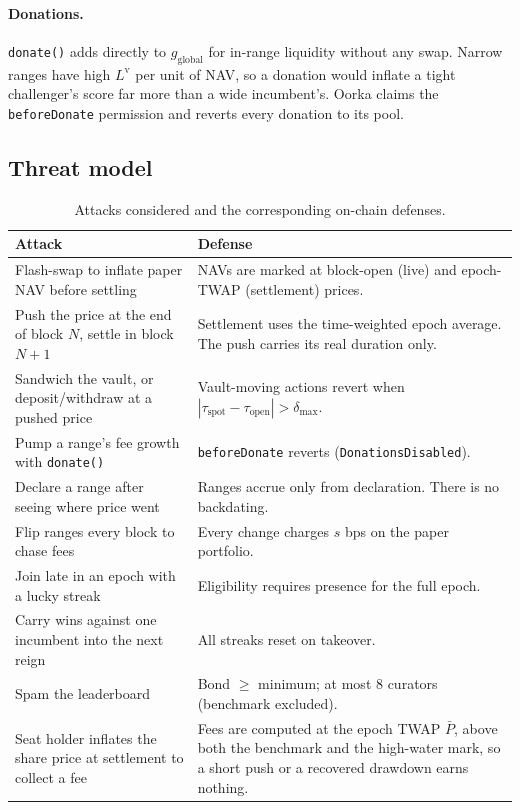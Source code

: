 \documentclass[11pt,a4paper]{article}
\newcommand{\code}[1]{\texttt{\small #1}}
\newcommand{\Lv}{L^{\mathrm{v}}}
\begin{document}
\paragraph{Donations.} \code{donate()} adds directly to $g_{\text{global}}$ for in-range liquidity without any swap. Narrow ranges have high $\Lv$ per unit of NAV, so a donation would inflate a tight challenger's score far more than a wide incumbent's. Oorka claims the \code{beforeDonate} permission and reverts every donation to its pool.

\subsection{Threat model}
\begin{table}[H]
\centering\small
\begin{tabularx}{\linewidth}{>{\raggedright\arraybackslash}p{5.2cm}X}
\toprule
\textbf{Attack} & \textbf{Defense} \\
\midrule
Flash-swap to inflate paper NAV before settling & NAVs are marked at block-open (live) and epoch-TWAP (settlement) prices. \\
Push the price at the end of block $N$, settle in block $N{+}1$ & Settlement uses the time-weighted epoch average. The push carries its real duration only. \\
Sandwich the vault, or deposit/withdraw at a pushed price & Vault-moving actions revert when $|\tau_{\text{spot}} - \tau_{\text{open}}| > \delta_{\max}$. \\
Pump a range's fee growth with \code{donate()} & \code{beforeDonate} reverts (\code{DonationsDisabled}). \\
Declare a range after seeing where price went & Ranges accrue only from declaration. There is no backdating. \\
Flip ranges every block to chase fees & Every change charges $s$ bps on the paper portfolio. \\
Join late in an epoch with a lucky streak & Eligibility requires presence for the full epoch. \\
Carry wins against one incumbent into the next reign & All streaks reset on takeover. \\
Spam the leaderboard & Bond $\ge$ minimum; at most 8 curators (benchmark excluded). \\
Seat holder inflates the share price at settlement to collect a fee & Fees are computed at the epoch TWAP $\bar P$, above both the benchmark and the high-water mark, so a short push or a recovered drawdown earns nothing. \\
\bottomrule
\end{tabularx}
\caption{Attacks considered and the corresponding on-chain defenses.}
\label{tab:threats}
\end{table}
\end{document}

